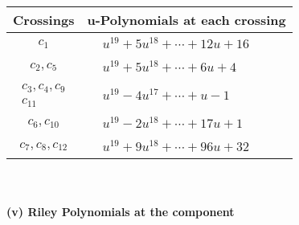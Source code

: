 \documentclass[1p]{elsarticle_modified}
\theoremstyle{definition}
\begin{document}
\begin{tabular}{m{50pt}|m{274pt}}
Crossings & \hspace{64pt}u-Polynomials at each crossing \\
\hline $$\begin{aligned}c_{1}\end{aligned}$$&$\begin{aligned}
&u^{19}+5 u^{18}+\cdots+12 u+16
\end{aligned}$\\
\hline $$\begin{aligned}c_{2},c_{5}\end{aligned}$$&$\begin{aligned}
&u^{19}+5 u^{18}+\cdots+6 u+4
\end{aligned}$\\
\hline $$\begin{aligned}c_{3},c_{4},c_{9}\\c_{11}\end{aligned}$$&$\begin{aligned}
&u^{19}-4 u^{17}+\cdots+u-1
\end{aligned}$\\
\hline $$\begin{aligned}c_{6},c_{10}\end{aligned}$$&$\begin{aligned}
&u^{19}-2 u^{18}+\cdots+17 u+1
\end{aligned}$\\
\hline $$\begin{aligned}c_{7},c_{8},c_{12}\end{aligned}$$&$\begin{aligned}
&u^{19}+9 u^{18}+\cdots+96 u+32
\end{aligned}$\\
\hline
\end{tabular}\\~\\
\newpage\renewcommand{\arraystretch}{1}
\flushleft \textbf{(v) Riley Polynomials at the component}\newline \\
\end{document}
